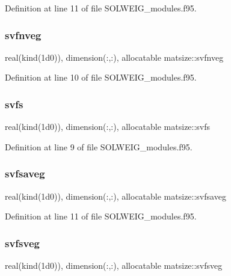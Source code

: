 Definition at line 11 of file S\+O\+L\+W\+E\+I\+G\+\_\+modules.\+f95.

\mbox{\label{namespacematsize_a7bfc9412546968d3a74b4956b47c8b44}} 
\subsubsection{\texorpdfstring{svfnveg}{svfnveg}}
{\footnotesize\ttfamily real(kind(1d0)), dimension(\+:,\+:), allocatable matsize\+::svfnveg}



Definition at line 10 of file S\+O\+L\+W\+E\+I\+G\+\_\+modules.\+f95.

\mbox{\label{namespacematsize_a13810d151375d64bd53a45cd89fad066}} 
\subsubsection{\texorpdfstring{svfs}{svfs}}
{\footnotesize\ttfamily real(kind(1d0)), dimension(\+:,\+:), allocatable matsize\+::svfs}



Definition at line 9 of file S\+O\+L\+W\+E\+I\+G\+\_\+modules.\+f95.

\mbox{\label{namespacematsize_adecb9ebed13e9583195d044af20c81c6}} 
\subsubsection{\texorpdfstring{svfsaveg}{svfsaveg}}
{\footnotesize\ttfamily real(kind(1d0)), dimension(\+:,\+:), allocatable matsize\+::svfsaveg}



Definition at line 11 of file S\+O\+L\+W\+E\+I\+G\+\_\+modules.\+f95.

\mbox{\label{namespacematsize_abb71084c2bde226d0a5b7227fd1fc5ce}} 
\subsubsection{\texorpdfstring{svfsveg}{svfsveg}}
{\footnotesize\ttfamily real(kind(1d0)), dimension(\+:,\+:), allocatable matsize\+::svfsveg}



